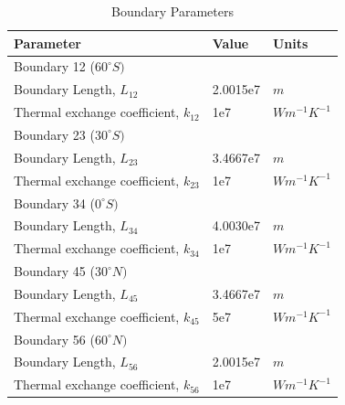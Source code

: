 \documentclass[12pt]{article}
\begin{document}
\begin{table}
    \captionsetup{singlelinecheck = false, justification=justified}
    \caption{Boundary Parameters}
    \begin{tabular}{lll}
    \hline
    Parameter & Value & Units\\
    \hline
    Boundary 12 ($60^{\circ}S)$ & & \\
    Boundary Length, $L_{12}$ & 2.0015e7 & $m$ \\
    Thermal exchange coefficient, $k_{12}$ & 1e7 & $Wm^{-1}K^{-1}$ \\ 
    Boundary 23 ($30^{\circ}S)$ & & \\
    Boundary Length, $L_{23}$ & 3.4667e7 & $m$ \\
    Thermal exchange coefficient, $k_{23}$ & 1e7 & $Wm^{-1}K^{-1}$ \\
    Boundary 34 ($0^{\circ}S)$ & & \\
    Boundary Length, $L_{34}$ & 4.0030e7 & $m$ \\
    Thermal exchange coefficient, $k_{34}$ & 1e7 & $Wm^{-1}K^{-1}$ \\ 
    Boundary 45 ($30^{\circ}N)$ & & \\
    Boundary Length, $L_{45}$ & 3.4667e7 & $m$ \\
    Thermal exchange coefficient, $k_{45}$ & 5e7 & $Wm^{-1}K^{-1}$ \\
    Boundary 56 ($60^{\circ}N)$ & & \\
    Boundary Length, $L_{56}$ & 2.0015e7 & $m$ \\
    Thermal exchange coefficient, $k_{56}$ & 1e7 & $Wm^{-1}K^{-1}$ \\
    \end{tabular}
    \label{tab:boundaryparams}
\end{table}
\FloatBarrier

\newpage
\printbibliography
\end{document}

